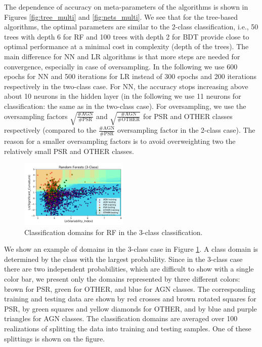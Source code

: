 The dependence of accuracy on meta-parameters of the algorithms is shown in Figures \ref{fig:tree_multi} and \ref{fig:nets_multi}.
We see that for the tree-based algorithms, the optimal parameters are similar to the 2-class classification, i.e., 50 trees with depth 6 for RF and 100 trees with depth 2 for BDT 
provide close to optimal performance at a minimal cost in complexity (depth of the trees).
The main difference for NN and LR algorithms is that more steps are needed for convergence, especially in case of oversampling. 
In the following we use 600 epochs for NN and 500 iterations for LR instead of 300 epochs and 200 iterations respectively in the two-class case.
For NN, the accuracy stops increasing above about 10 neurons in the hidden layer (in the following we use 11 neurons for classification: the same as in the two-class case).
For oversampling, we use the oversampling factors $\sqrt{\frac{\text{\# AGN}}{\text{\# PSR}}}$ and $\sqrt{\frac{\text{\# AGN}}{\text{\# OTHER}}}$ for PSR and OTHER classes respectively (compared to the $\frac{\text{\# AGN}}{\text{\# PSR}}$ oversampling factor in the 2-class case).
The reason for a smaller oversampling factors is to avoid overweighting two the relatively small PSR and OTHER classes.

\begin{figure}[h]
\includegraphics[width=0.46\textwidth]{plots/classification_domains/rf_50_6_3class.pdf}
\caption{Classification domains for RF in the 3-class classification.
}
\label{fig:RF_domains_3class}
\end{figure}

We show an example of domains in the 3-class case in Figure \ref{fig:RF_domains_3class}.
A class domain is determined by the class with the largest probability.
Since in the 3-class case there are two independent probabilities, which are difficult to show with a single color bar,
we present only the domains represented by three different colors: brown for PSR, green for OTHER, and blue for AGN classes.
The corresponding training and testing data are shown by red crosses and brown rotated squares for PSR, by green squares and yellow diamonds for OTHER,
and by blue and purple triangles for AGN classes.
The classification domains are averaged over 100 realizations of splitting the data into training and testing samples.
One of these splittings is shown on the figure.


